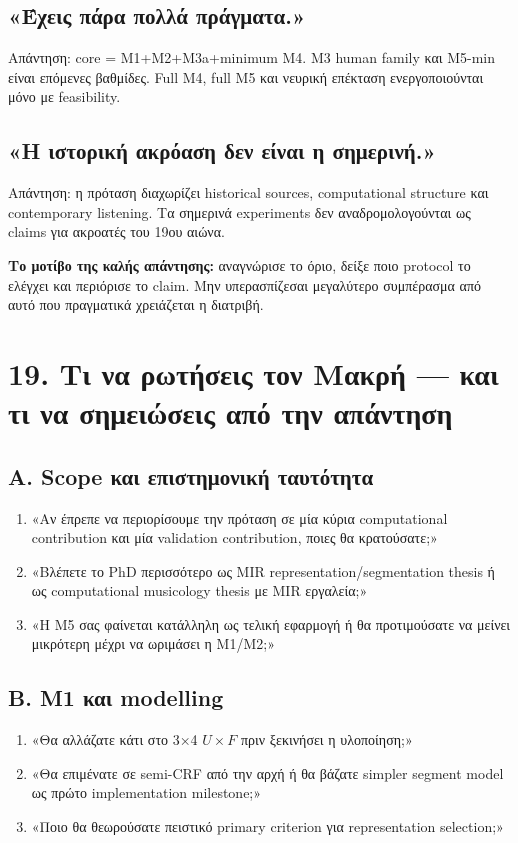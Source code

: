 \documentclass[9pt,a4paper]{extarticle}
\begin{document}
\subsection*{«Έχεις πάρα πολλά πράγματα.»}
Απάντηση: core = M1+M2+M3a+minimum M4. M3 human family και M5-min είναι επόμενες βαθμίδες. Full M4, full M5 και νευρική επέκταση ενεργοποιούνται μόνο με feasibility.

\subsection*{«Η ιστορική ακρόαση δεν είναι η σημερινή.»}
Απάντηση: η πρόταση διαχωρίζει historical sources, computational structure και contemporary listening. Τα σημερινά experiments δεν αναδρομολογούνται ως claims για ακροατές του 19ου αιώνα.

\begin{keybox}
\textbf{Το μοτίβο της καλής απάντησης:} αναγνώρισε το όριο, δείξε ποιο protocol το ελέγχει και περιόρισε το claim. Μην υπερασπίζεσαι μεγαλύτερο συμπέρασμα από αυτό που πραγματικά χρειάζεται η διατριβή.
\end{keybox}

\newpage
\section*{19. Τι να ρωτήσεις τον Μακρή — και τι να σημειώσεις από την απάντηση}

\subsection*{Α. Scope και επιστημονική ταυτότητα}
\begin{enumerate}
\item «Αν έπρεπε να περιορίσουμε την πρόταση σε μία κύρια computational contribution και μία validation contribution, ποιες θα κρατούσατε;»
\item «Βλέπετε το PhD περισσότερο ως MIR representation/segmentation thesis ή ως computational musicology thesis με MIR εργαλεία;»
\item «Η M5 σας φαίνεται κατάλληλη ως τελική εφαρμογή ή θα προτιμούσατε να μείνει μικρότερη μέχρι να ωριμάσει η M1/M2;»
\end{enumerate}

\subsection*{Β. M1 και modelling}
\begin{enumerate}
\item «Θα αλλάζατε κάτι στο 3×4 \(U\times F\) πριν ξεκινήσει η υλοποίηση;»
\item «Θα επιμένατε σε semi-CRF από την αρχή ή θα βάζατε simpler segment model ως πρώτο implementation milestone;»
\item «Ποιο θα θεωρούσατε πειστικό primary criterion για representation selection;»
\end{enumerate}
\end{document}
